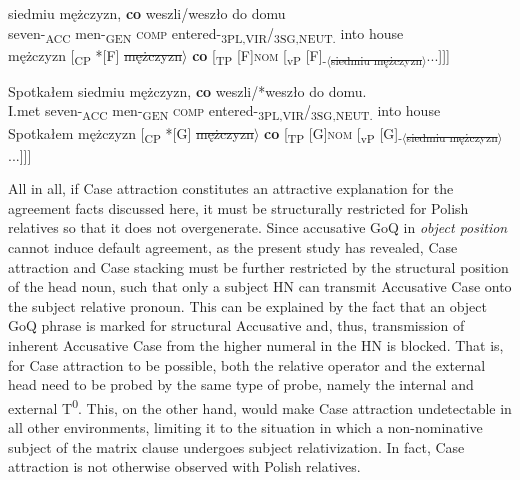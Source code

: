 \documentclass[output=paper]{langsci/langscibook}
\begin{document}
\ea%
    \label{ex:leska:33}
    \gll siedmiu   mężczyzn,   \textbf{co}   weszli/weszło     do   domu\\
         seven-\textsubscript{ACC}   men-\textsubscript{GEN}   \textsc{comp}   entered-\textsubscript{3PL,VIR}/\textsubscript{3SG,NEUT.} into   house \\
    \glt {} mężczyzn [\textsubscript{CP} *[F]\st{ mężczyzn}$\rangle$ \textbf{co} [\textsubscript{TP} [F]{\footnotesize\textsc{nom}} [\textsubscript{vP} [F]\textsubscript{-$\langle$\st{siedmiu mężczyzn}$\rangle$}...]]]
\z

\ea%
    \label{ex:leska:34}
    \gll Spotkałem   siedmiu   mężczyzn,   \textbf{co}   weszli/*weszło do   domu.\\
         I.met     seven-\textsubscript{ACC}   men-\textsubscript{GEN}   \textsc{comp} entered-\textsubscript{3PL,VIR}/\textsubscript{3SG,NEUT.} into   house\\
    \glt Spotkałem  mężczyzn [\textsubscript{CP} *[G]\st{ mężczyzn}$\rangle$ \textbf{co} [\textsubscript{TP} [G]{\footnotesize\textsc{nom}} [\textsubscript{vP} [G]\textsubscript{-$\langle$\st{siedmiu mężczyzn}$\rangle$}...]]]
\z


All in all, if Case attraction constitutes an attractive explanation for the agreement facts discussed here, it must be structurally restricted for Polish relatives so that it does not overgenerate. Since accusative GoQ in \textit{object position} cannot induce default agreement, as the present study has revealed, Case attraction and Case stacking must be further restricted by the structural position of the head noun, such that only a subject HN can transmit Accusative Case onto the subject relative pronoun. This can be explained by the fact that an object GoQ phrase is marked for structural Accusative and, thus, transmission of inherent Accusative Case from the higher numeral in the HN is blocked. That is, for Case attraction to be possible, both the relative operator and the external head need to be probed by the same type of probe, namely the internal and external T\textsuperscript{0}. This, on the other hand, would make Case attraction undetectable in all other environments, limiting it to the situation in which a non-nominative subject of the matrix clause undergoes subject relativization. In fact, Case attraction is not otherwise observed with Polish relatives. 
\end{document}
